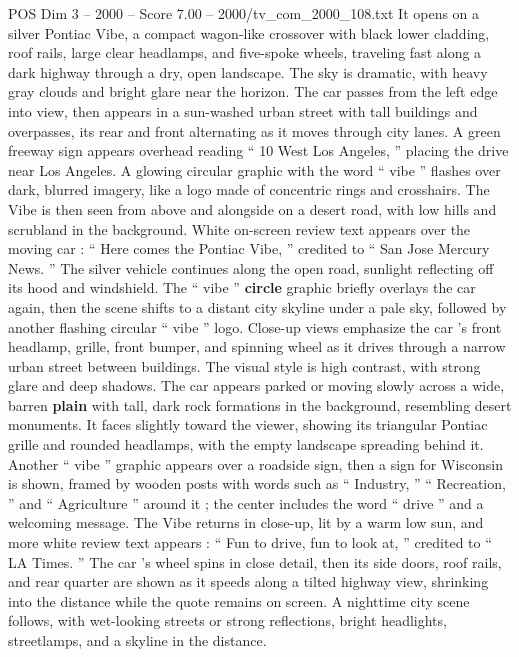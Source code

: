 \begin{textsample}{POS Dim 3 – 2000 – Score 7.00 – 2000/tv\_com\_2000\_108.txt}  \label{ex:f3_pos_063}
It opens on a silver Pontiac Vibe, a compact wagon-like crossover with black lower cladding, roof rails, large clear headlamps, and five-spoke wheels, traveling fast along a dark highway through a dry, open landscape.
The sky is dramatic, with heavy gray clouds and bright glare near the horizon.
The car passes from the left edge into view, then appears in a sun-washed urban street with tall buildings and overpasses, its rear and front alternating as it moves through city lanes.
A green freeway sign appears overhead reading “ 10 West Los Angeles, ” placing the drive near Los Angeles.
A glowing circular graphic with the word “ vibe ” flashes over dark, blurred imagery, like a logo made of concentric rings and crosshairs.
The Vibe is then seen from above and alongside on a desert road, with low hills and scrubland in the background.
White on-screen review text appears over the moving car : “ Here comes the Pontiac Vibe, ” credited to “ San Jose Mercury News. ” The silver vehicle continues along the open road, sunlight reflecting off its hood and windshield.
The “ vibe ” \textbf{circle} graphic briefly overlays the car again, then the scene shifts to a distant city skyline under a pale sky, followed by another flashing circular “ vibe ” logo.
Close-up views emphasize the car ’s front headlamp, grille, front bumper, and spinning wheel as it drives through a narrow urban street between buildings.
The visual style is high contrast, with strong glare and deep shadows.
The car appears parked or moving slowly across a wide, barren \textbf{plain} with tall, dark rock formations in the background, resembling desert monuments.
It faces slightly toward the viewer, showing its triangular Pontiac grille and rounded headlamps, with the empty landscape spreading behind it.
Another “ vibe ” graphic appears over a roadside sign, then a sign for Wisconsin is shown, framed by wooden posts with words such as “ Industry, ” “ Recreation, ” and “ Agriculture ” around it ; the center includes the word “ drive ” and a welcoming message.
The Vibe returns in close-up, lit by a warm low sun, and more white review text appears : “ Fun to drive, fun to look at, ” credited to “ LA Times. ” The car ’s wheel spins in close detail, then its side doors, roof rails, and rear quarter are shown as it speeds along a tilted highway view, shrinking into the distance while the quote remains on screen.
A nighttime city scene follows, with wet-looking streets or strong reflections, bright headlights, streetlamps, and a skyline in the distance.

\end{textsample}
